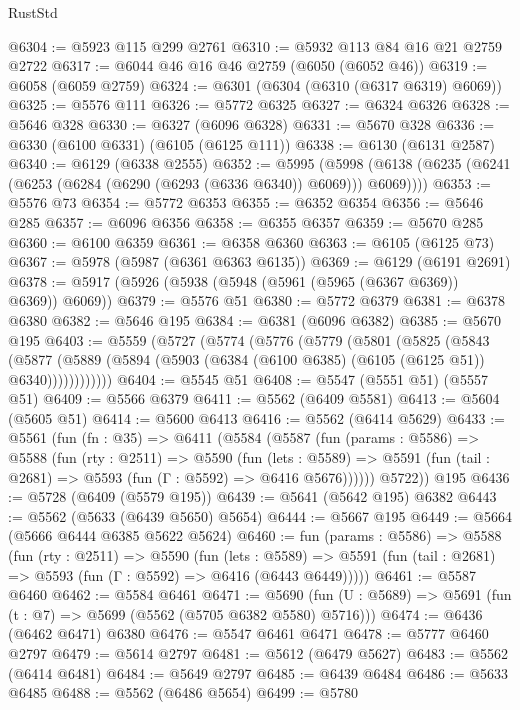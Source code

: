 \begin{lexlean}{RustStd}
\begin{coremodule}
@6304 := @5923 @115 @299 @2761
@6310 := @5932 @113 @84 @16 @21 @2759 @2722
@6317 := @6044 @46 @16 @46 @2759 (@6050 (@6052 @46))
@6319 := @6058 (@6059 @2759)
@6324 := @6301 (@6304 (@6310 (@6317 @6319) @6069))
@6325 := @5576 @111
@6326 := @5772 @6325
@6327 := @6324 @6326
@6328 := @5646 @328
@6330 := @6327 (@6096 @6328)
@6331 := @5670 @328
@6336 := @6330 (@6100 @6331) (@6105 (@6125 @111))
@6338 := @6130 (@6131 @2587)
@6340 := @6129 (@6338 @2555)
@6352 := @5995
    (@5998 (@6138 (@6235 (@6241 (@6253 (@6284 (@6290 (@6293 (@6336 @6340)) @6069))) @6069))))
@6353 := @5576 @73
@6354 := @5772 @6353
@6355 := @6352 @6354
@6356 := @5646 @285
@6357 := @6096 @6356
@6358 := @6355 @6357
@6359 := @5670 @285
@6360 := @6100 @6359
@6361 := @6358 @6360
@6363 := @6105 (@6125 @73)
@6367 := @5978 (@5987 (@6361 @6363 @6135))
@6369 := @6129 (@6191 @2691)
@6378 := @5917 (@5926 (@5938 (@5948 (@5961 (@5965 (@6367 @6369)) @6369)) @6069))
@6379 := @5576 @51
@6380 := @5772 @6379
@6381 := @6378 @6380
@6382 := @5646 @195
@6384 := @6381 (@6096 @6382)
@6385 := @5670 @195
@6403 := @5559
    (@5727
      (@5774
        (@5776
          (@5779
            (@5801
              (@5825
                (@5843
                  (@5877
                    (@5889 (@5894 (@5903 (@6384 (@6100 @6385) (@6105 (@6125 @51)) @6340))))))))))))
@6404 := @5545 @51
@6408 := @5547 (@5551 @51) (@5557 @51)
@6409 := @5566 @6379
@6411 := @5562 (@6409 @5581)
@6413 := @5604 (@5605 @51)
@6414 := @5600 @6413
@6416 := @5562 (@6414 @5629)
@6433 := @5561
    (fun (fn : @35) =>
    @6411
      (@5584
        (@5587
          (fun (params : @5586) =>
          @5588
            (fun (rty : @2511) =>
            @5590
              (fun (lets : @5589) =>
              @5591 (fun (tail : @2681) => @5593 (fun (Γ : @5592) => @6416 @5676))))))
        @5722))
    @195
@6436 := @5728 (@6409 (@5579 @195))
@6439 := @5641 (@5642 @195) @6382
@6443 := @5562 (@5633 (@6439 @5650) @5654)
@6444 := @5667 @195
@6449 := @5664 (@5666 @6444 @6385 @5622 @5624)
@6460 := fun (params : @5586) =>
  @5588
    (fun (rty : @2511) =>
    @5590
      (fun (lets : @5589) =>
      @5591 (fun (tail : @2681) => @5593 (fun (Γ : @5592) => @6416 (@6443 @6449)))))
@6461 := @5587 @6460
@6462 := @5584 @6461
@6471 := @5690 (fun (U : @5689) => @5691 (fun (t : @7) => @5699 (@5562 (@5705 @6382 @5580) @5716)))
@6474 := @6436 (@6462 @6471) @6380
@6476 := @5547 @6461 @6471
@6478 := @5777 @6460 @2797
@6479 := @5614 @2797
@6481 := @5612 (@6479 @5627)
@6483 := @5562 (@6414 @6481)
@6484 := @5649 @2797
@6485 := @6439 @6484
@6486 := @5633 @6485
@6488 := @5562 (@6486 @5654)
@6499 := @5780

\end{coremodule}
\end{lexlean}
